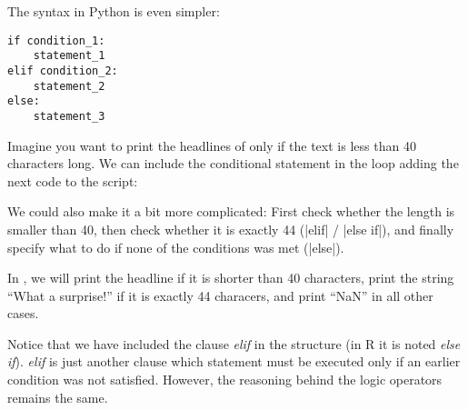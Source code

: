 The syntax in Python is even simpler:

\begin{verbatim}
if condition_1:
    statement_1
elif condition_2:
    statement_2
else:
    statement_3
\end{verbatim}

Imagine you want to print the headlines of  only if the text is less than 40 characters long. We can include the conditional statement in the loop adding the next code to the script:


We could also make it a bit more complicated: First check whether the length is smaller than 40, then check whether it is exactly 44 (|elif| / |else if|), and finally specify what to do if none of the conditions was met (|else|).

In , we will print the headline if it is shorter than 40 characters, print the string ``What a surprise!'' if it is exactly 44 characers, and print ``NaN'' in all other cases. 


Notice that we have included the clause \emph{elif} in the structure (in R it is noted \emph{else if}). \emph{elif} is just another clause which statement must be executed only if an earlier condition was not satisfied. However, the reasoning behind the logic operators remains the same.
